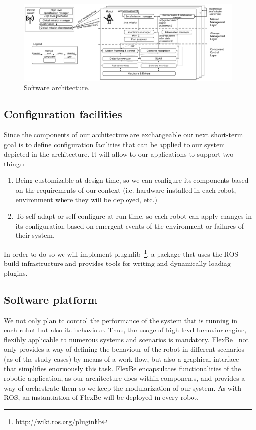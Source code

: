 \begin{figure}[!t]
\begin{center}
\includegraphics[width=1\linewidth]{Figures/InstanceMultiRobot_Graffle.pdf}
\caption{Software architecture.}
\label{fig:arch}
\end{center}
\end{figure}

\subsection{Configuration facilities}

Since the components of our architecture are exchangeable our next short-term goal is to define configuration facilities that can be applied to our system depicted in the architecture.
It will allow to our applications to support two things:
\begin{enumerate}
\item Being customizable at design-time, so we can configure its components based on the requirements of our context (i.e. hardware installed in each robot, environment where they will be deployed, etc.)
\item To self-adapt or self-configure at run time, so each robot can apply changes in its configuration based on emergent events of the environment or failures of their system.
\end{enumerate}

In order to do so we will implement pluginlib~\footnote{http://wiki.ros.org/pluginlib}, a package that uses the ROS build infrastructure and provides tools for writing and dynamically loading plugins.

\subsection{Software platform}

We not only plan to control the performance of the system that is running in each robot but also its behaviour.
Thus, the usage of high-level behavior engine, flexibly applicable to numerous systems and scenarios is mandatory.
FlexBe~\cite{Schillinger2016} not only provides a way of defining the behaviour of the robot in different scenarios (as of the study cases) by means of a work flow, but also a graphical interface that simplifies enormously this task.
FlexBe encapsulates functionalities of the robotic application, as our architecture does within components, and provides a way of orchestrate them so we keep the modularization of our system.
As with ROS, an instantiation of FlexBe will be deployed in every robot.

